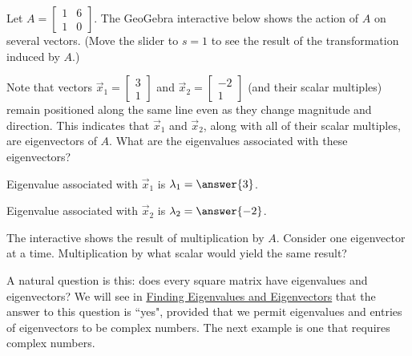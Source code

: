 \documentclass{ximera}
\begin{document}
\begin{exploration}
Let $A=\begin{bmatrix}1&6\\1&0\end{bmatrix}$.  The GeoGebra interactive below shows the action of $A$ on several vectors.  (Move the slider to $s=1$ to see the result of the transformation induced by $A$.)  
\begin{center}
\end{center}
Note that vectors $\vec{x}_1=\begin{bmatrix}3\\1\end{bmatrix}$ and $\vec{x}_2=\begin{bmatrix}-2\\1\end{bmatrix}$ (and their scalar multiples) remain positioned along the same line even as they change magnitude and direction.  This indicates that $\vec{x}_1$ and $\vec{x}_2$, along with all of their scalar multiples, are eigenvectors of $A$.  What are the eigenvalues associated with these eigenvectors?

Eigenvalue associated with $\vec{x}_1$ is $\lambda_1=\answer{3}$.

Eigenvalue associated with $\vec{x}_2$ is $\lambda_2=\answer{-2}$.

\begin{hint}
    The interactive shows the result of multiplication by $A$. 
 Consider one eigenvector at a time.  Multiplication by what scalar would yield the same result?
\end{hint}

\end{exploration}


A natural question is this: does every square matrix have eigenvalues and eigenvectors?  We will see in \href{https://ximera.osu.edu/oerlinalg/LinearAlgebra/EIG-0020/main}{Finding Eigenvalues and Eigenvectors} that the answer to this question is ``yes", provided that we permit eigenvalues and entries of eigenvectors to be complex numbers.  The next example is one that requires complex numbers.
\end{document}
